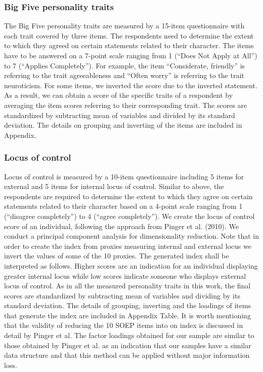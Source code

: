 \documentclass[%
    a4paper,            %
    11pt,               %
    bibliography=totoc, %
]
{scrartcl}
\begin{document}
\subsubsection{Big Five personality traits}

The Big Five personality traits are measured by a 15-item questionnaire with each trait covered by three items. The respondents need to determine the extent to which they agreed on certain statements related to their character. The items have to be answered on a 7-point scale ranging from 1 (“Does Not Apply at All”) to 7 (“Applies Completely”). For example, the item “Considerate, friendly” is referring to the trait agreeableness and “Often worry” is referring to the trait neuroticism. For some items, we inverted the score due to the inverted statement.
As a result, we can obtain a score of the specific traits of a respondent by averaging the item scores referring to their corresponding trait. The scores are standardized by subtracting mean of variables and divided by its standard deviation. The details on grouping and inverting of the items are included in Appendix.

\subsubsection{Locus of control}

Locus of control is measured by a 10-item questionnaire including 5 items for external and 5 items for internal locus of control. Similar to above, the respondents are required to determine the extent to which they agree on certain statements related to their character based on a 4-point scale ranging from 1 (“disagree completely”) to 4 (“agree completely”).
We create the locus of control score of an individual, following the approach from Pinger et al. (2010). We conduct a principal component analysis for dimensionality reduction. Note that in order to create the index from proxies measuring internal and external locus we invert the values of some of the 10 proxies. The generated index shall be interpreted as follows. Higher scores are an indication for an individual displaying greater internal locus while low scores indicate someone who displays external locus of control. As in all the measured personality traits in this work, the final scores are standardized by subtracting mean of variables and dividing by its standard deviation. The details of grouping, inverting and the loadings of items that generate the index are included in Appendix Table. It is worth mentioning that the validity of reducing the 10 SOEP items into on index is discussed in detail by Pinger et al. The factor loadings obtained for our sample are similar to those obtained by Pinger et al. as an indication that our samples have a similar data structure and that this method can be applied without major information loss.
\end{document}
